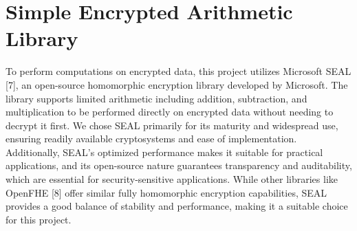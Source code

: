 \section{Simple Encrypted Arithmetic Library}

To perform computations on encrypted data, this project utilizes Microsoft SEAL [7], an open-source homomorphic encryption library developed by Microsoft. The library supports limited arithmetic including addition, subtraction, and multiplication to be performed directly on encrypted data without needing to decrypt it first. We chose SEAL primarily for its maturity and widespread use, ensuring readily available cryptosystems and ease of implementation. Additionally, SEAL's optimized performance makes it suitable for practical applications, and its open-source nature guarantees transparency and auditability, which are essential for security-sensitive applications. While other libraries like OpenFHE [8] offer similar fully homomorphic encryption capabilities, SEAL provides a good balance of stability and performance, making it a suitable choice for this project.
